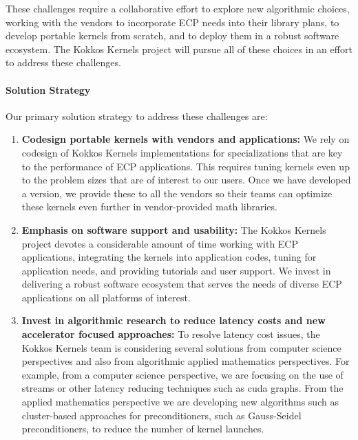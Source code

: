 These challenges require a collaborative effort to explore new algorithmic choices,
working with the vendors to incorporate ECP needs into their library plans, to develop
portable kernels from scratch, and to deploy them in a robust software ecosystem. The Kokkos
Kernels project will pursue all of these choices in an effort to address these challenges.

\paragraph{Solution Strategy}

Our primary solution strategy to address these challenges are:
\begin{enumerate}
    \item \textbf{Codesign portable kernels with vendors and applications:}
    We rely on codesign of Kokkos Kernels implementations for
    specializations that are key to the performance of ECP applications. This
    requires tuning kernels even up to the problem sizes that are of interest
    to our users. Once we have developed a version, we provide these
    to all the vendors so their teams can optimize these kernels even
    further in vendor-provided math libraries.
   \item \textbf{Emphasis on software support and usability:}
	The Kokkos Kernels project devotes a considerable amount of time working with
	ECP applications, integrating the kernels into application codes, tuning
	for application needs, and providing tutorials and user support. We invest
	in delivering a robust software ecosystem that serves the
	needs of diverse ECP applications on all platforms of interest.
   \item \textbf{Invest in algorithmic research to reduce latency costs and new accelerator focused approaches:} 
   To resolve latency cost issues, the Kokkos Kernels team is considering several solutions from computer science
   perspectives and also from algorithmic applied mathematics perspectives. 
   For example, from a computer science perspective, we are focusing on the
   use of streams or other latency reducing techniques such as cuda graphs. From
   the applied mathematics perspective we are developing new algorithms such
   as cluster-based approaches for preconditioners, such as Gauss-Seidel preconditioners,
   to reduce the number of kernel launches. 
\end{enumerate}

